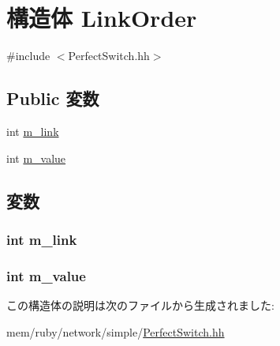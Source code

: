 \hypertarget{structLinkOrder}{
\section{構造体 LinkOrder}
\label{structLinkOrder}
}


{\ttfamily \#include $<$PerfectSwitch.hh$>$}\subsection*{Public 変数}
\begin{DoxyCompactItemize}
\item 
int \hyperlink{structLinkOrder_ad97c06cfdda34a370fe1b9ec6deb3084}{m\_\-link}
\item 
int \hyperlink{structLinkOrder_a86b901b1425c1d809cd8b2ac3f71b1ce}{m\_\-value}
\end{DoxyCompactItemize}


\subsection{変数}
\hypertarget{structLinkOrder_ad97c06cfdda34a370fe1b9ec6deb3084}{
\subsubsection[{m\_\-link}]{\setlength{\rightskip}{0pt plus 5cm}int {\bf m\_\-link}}}
\label{structLinkOrder_ad97c06cfdda34a370fe1b9ec6deb3084}
\hypertarget{structLinkOrder_a86b901b1425c1d809cd8b2ac3f71b1ce}{
\subsubsection[{m\_\-value}]{\setlength{\rightskip}{0pt plus 5cm}int {\bf m\_\-value}}}
\label{structLinkOrder_a86b901b1425c1d809cd8b2ac3f71b1ce}


この構造体の説明は次のファイルから生成されました:\begin{DoxyCompactItemize}
\item 
mem/ruby/network/simple/\hyperlink{PerfectSwitch_8hh}{PerfectSwitch.hh}\end{DoxyCompactItemize}
